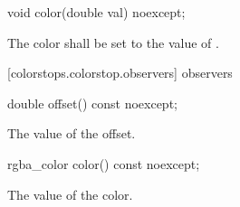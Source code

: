 \begin{itemdecl}
	void color(double val) noexcept;
\end{itemdecl}
\begin{itemdescr}
	\pnum
	\effects
	The color shall be set to the value of .
\end{itemdescr}

 [colorstops.colorstop.observers]{ observers}

\begin{itemdecl}
	double offset() const noexcept;
\end{itemdecl}
\begin{itemdescr}
	\pnum
	\returns
	The value of the offset.
\end{itemdescr}

\begin{itemdecl}
	rgba_color color() const noexcept;
\end{itemdecl}
\begin{itemdescr}
	\pnum
	\returns
	The value of the color.
\end{itemdescr}
